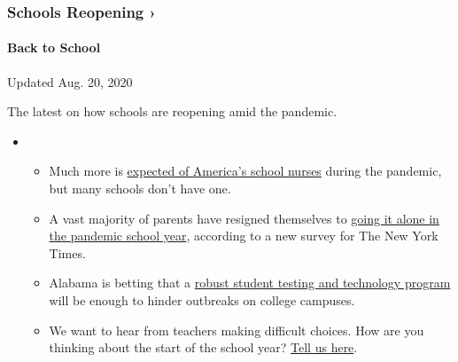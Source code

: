 \href{https://www.nytimes3xbfgragh.onion/spotlight/schools-reopening?action=click\&pgtype=Article\&state=default\&region=MAIN_CONTENT_3\&context=storylines_keepup}{}

\hypertarget{schools-reopening-}{%
\subsubsection{Schools Reopening ›}\label{schools-reopening-}}

\hypertarget{back-to-school}{%
\paragraph{Back to School}\label{back-to-school}}

Updated Aug. 20, 2020

The latest on how schools are reopening amid the pandemic.

\begin{itemize}
\item
  \begin{itemize}
  \tightlist
  \item
    Much more is
    \href{https://www.nytimes3xbfgragh.onion/2020/08/20/us/schools-reopening-nurses-covid.html?action=click\&pgtype=Article\&state=default\&region=MAIN_CONTENT_3\&context=storylines_keepup}{expected
    of America's school nurses} during the pandemic, but many schools
    don't have one.
  \item
    A vast majority of parents have resigned themselves to
    \href{https://www.nytimes3xbfgragh.onion/2020/08/19/us/colleges-closing-covid.html?action=click\&pgtype=Article\&state=default\&region=MAIN_CONTENT_3\&context=storylines_keepup}{going
    it alone in the pandemic school year}, according to a new survey for
    The New York Times.
  \item
    Alabama is betting that a
    \href{https://www.nytimes3xbfgragh.onion/2020/08/19/business/alabama-uab-coronavirus-tests.html?action=click\&pgtype=Article\&state=default\&region=MAIN_CONTENT_3\&context=storylines_keepup}{robust
    student testing and technology program} will be enough to hinder
    outbreaks on college campuses.
  \item
    We want to hear from teachers making difficult choices. How are you
    thinking about the start of the school year?
    \href{https://www.nytimes3xbfgragh.onion/2020/08/19/us/teachers-school-reopenings.html?action=click\&pgtype=Article\&state=default\&region=MAIN_CONTENT_3\&context=storylines_keepup}{Tell
    us here}.
  \end{itemize}
\end{itemize}

